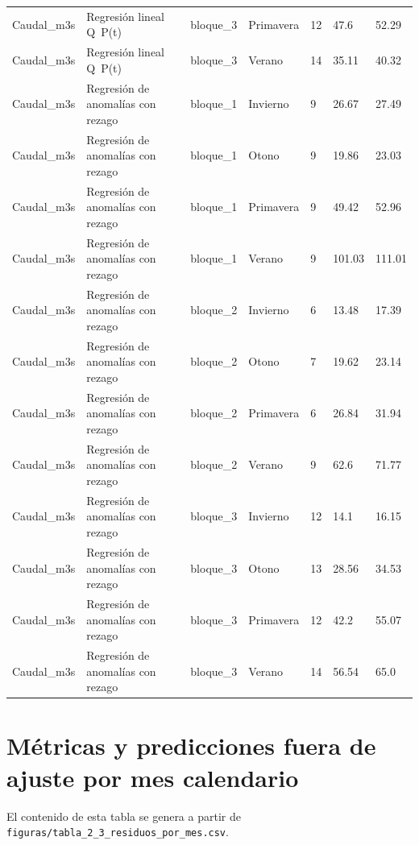 \begin{longtable}{lllllll}
Caudal\_m3s & Regresión lineal Q~P(t) & bloque\_3 & Primavera & 12 & 47.6 & 52.29 \\
Caudal\_m3s & Regresión lineal Q~P(t) & bloque\_3 & Verano & 14 & 35.11 & 40.32 \\
Caudal\_m3s & Regresión de anomalías con rezago & bloque\_1 & Invierno & 9 & 26.67 & 27.49 \\
Caudal\_m3s & Regresión de anomalías con rezago & bloque\_1 & Otono & 9 & 19.86 & 23.03 \\
Caudal\_m3s & Regresión de anomalías con rezago & bloque\_1 & Primavera & 9 & 49.42 & 52.96 \\
Caudal\_m3s & Regresión de anomalías con rezago & bloque\_1 & Verano & 9 & 101.03 & 111.01 \\
Caudal\_m3s & Regresión de anomalías con rezago & bloque\_2 & Invierno & 6 & 13.48 & 17.39 \\
Caudal\_m3s & Regresión de anomalías con rezago & bloque\_2 & Otono & 7 & 19.62 & 23.14 \\
Caudal\_m3s & Regresión de anomalías con rezago & bloque\_2 & Primavera & 6 & 26.84 & 31.94 \\
Caudal\_m3s & Regresión de anomalías con rezago & bloque\_2 & Verano & 9 & 62.6 & 71.77 \\
Caudal\_m3s & Regresión de anomalías con rezago & bloque\_3 & Invierno & 12 & 14.1 & 16.15 \\
Caudal\_m3s & Regresión de anomalías con rezago & bloque\_3 & Otono & 13 & 28.56 & 34.53 \\
Caudal\_m3s & Regresión de anomalías con rezago & bloque\_3 & Primavera & 12 & 42.2 & 55.07 \\
Caudal\_m3s & Regresión de anomalías con rezago & bloque\_3 & Verano & 14 & 56.54 & 65.0 \\
\end{longtable}

\section{Métricas y predicciones fuera de ajuste por mes calendario}
El contenido de esta tabla se genera a partir de \texttt{figuras/tabla_2_3_residuos_por_mes.csv}.

